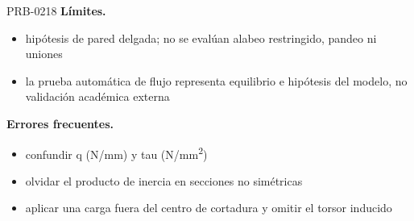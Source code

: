 \begin{studiumworked}{PRB-0218}
\textbf{Límites.}\begin{itemize}\item hipótesis de pared delgada; no se evalúan alabeo restringido, pandeo ni uniones
\item la prueba automática de flujo representa equilibrio e hipótesis del modelo, no validación académica externa\end{itemize}

\textbf{Errores frecuentes.}\begin{itemize}\item confundir q (N/mm) y tau (N/mm\textsuperscript{2})
\item olvidar el producto de inercia en secciones no simétricas
\item aplicar una carga fuera del centro de cortadura y omitir el torsor inducido\end{itemize}

\end{studiumworked}

\Needspace{.3\textheight}

